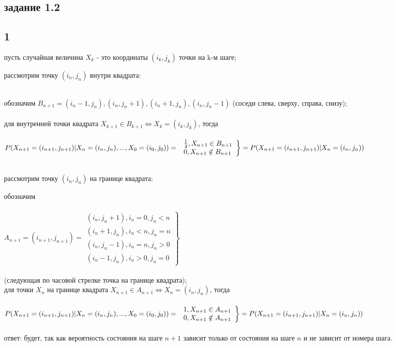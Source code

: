 \documentclass[a4paper]{article}
\begin{document}
\begin{large}
	\section*{задание 1.2}
	\subsection*{1}
	пусть случайная величина $X_k$ - это координаты $(i_k,j_k)$ точки на k-м шаге;\\
	\begin{bf}
		рассмотрим точку $(i_n,j_n)$ внутри квадрата:\\\\
	\end{bf}
	обозначим $B_{n+1}={(i_n-1,j_n),(i_n,j_n+1),(i_n+1,j_n),(i_n,j_n-1)}$ (соседи слева, сверху, справа, снизу);\\\\
	для внутренней точки квадрата $X_{k+1}\in B_{k+1} \Leftrightarrow X_k=(i_k,j_k)$, тогда\\\\
	$
	P(X_{n+1}=(i_{n+1},j_{n+1})|X_n=(i_n,j_n),...,X_0=(i_0,j_0))=\\\\
	\left.
	\begin{array}{ll}
		\frac{1}{4},X_{n+1}\in B_{n+1}\\
		0,X_{n+1}\notin B_{n+1}
	\end{array}
	\right\}=P(X_{n+1}=(i_{n+1},j_{n+1})|X_n=(i_n,j_n))
	$\\\\
	\begin{bf}
		рассмотрим точку $(i_n,j_n)$ на границе квадрата:\\
	\end{bf}
	обозначим\\\\
	$
	A_{n+1}=(i_{n+1},j_{n+1})=\left.
	\begin{array}{ll}
		(i_n,j_n+1),i_n=0,j_n<n\\
		(i_n+1,j_n),i_n<n,j_n=n\\
		(i_n,j_n-1),i_n=n,j_n>0\\
		(i_n-1,j_n),i_n>0,j_n=0
	\end{array}
	\right\}
	$\\\\
	(следующая по часовой стрелке точка на границе квадрата);\\
	для точки $X_n$ на границе квадрата $X_{n+1}\in A_{n+1} \Leftrightarrow X_n=(i_n,j_n)$, тогда\\\\
	$
	P(X_{n+1}=(i_{n+1},j_{n+1})|X_n=(i_n,j_n),...,X_0=(i_0,j_0))=\\\\
	\left.
	\begin{array}{ll}
		1,X_{n+1}\in A_{n+1}\\
		0,X_{n+1}\notin A_{n+1}
	\end{array}
	\right\}=P(X_{n+1}=(i_{n+1},j_{n+1})|X_n=(i_n,j_n))
	$\\\\
	ответ: будет, так как вероятность состояния на шаге $n+1$ зависит только от состояния на шаге $n$ и не зависит от номера шага.

\end{large}
\end{document}
